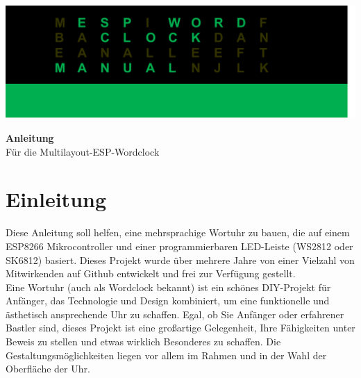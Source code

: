 \documentclass[12pt,a4paper, german,oneside, headinclude, headsepline,plainheadsepline,BCOR20mm, DIV18,parskip=half, openright, numbers=noenddot, captions=tableheading,version=first,listof=totoc,version=first]{scrbook}
\begin{document}
\thispagestyle{empty}
\setcounter{page}{-1}

\includegraphics*[width = \textwidth]{Logos/Logo.pdf}

\vspace{25mm}

{\centering

\LARGE\textbf{{Anleitung}}\\
\vspace{1em}
\large{Für die Multilayout-ESP-Wordclock} \\

\par}


\newpage
\thispagestyle{empty}

\cleardoublepage

\cleardoublestandardpage

\begin{spacing}{1.15}		
\tableofcontents 		

\end{spacing}

\cleardoublestandardpage

\mainmatter							

\chapter{Einleitung}

Diese Anleitung soll helfen, eine mehrsprachige Wortuhr zu bauen, die auf einem ESP8266 Mikrocontroller und einer programmierbaren LED-Leiste (WS2812 oder SK6812) basiert. Dieses Projekt wurde über mehrere Jahre von einer Vielzahl von Mitwirkenden auf Github entwickelt und frei zur Verfügung gestellt.\\
Eine Wortuhr (auch als Wordclock bekannt) ist ein schönes DIY-Projekt für Anfänger, das Technologie und Design kombiniert, um eine funktionelle und ästhetisch ansprechende Uhr zu schaffen. Egal, ob Sie Anfänger oder erfahrener Bastler sind, dieses Projekt ist eine großartige Gelegenheit, Ihre Fähigkeiten unter Beweis zu stellen und etwas wirklich Besonderes zu schaffen. Die Gestaltungsmöglichkeiten liegen vor allem im Rahmen und in der Wahl der Oberfläche der Uhr. 
\end{document}

